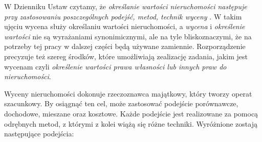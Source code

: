 \documentclass[a4paper,12pt,twoside,openany]{report}
\begin{document}
W Dzienniku Ustaw czytamy, że \textit{określanie wartości nieruchomości następuje przy zastosowaniu poszczególnych podejść, metod, technik wyceny} \cite{OPRM}. W takim ujęciu wycena służy określaniu wartości nieruchomości, a \textit{wycena} i \textit{określenie wartości} nie są wyrażaniami synonimicznymi, ale na tyle bliskoznaczymi, że na potrzeby tej pracy w dalszej części będą używane zamiennie.
Rozporządzenie precyzuje też szereg środków, które umożliwiają zealizację zadania, jakim jest wycenam czyli \textit {określenie wartości prawa własności lub innych praw do nieruchomości}.

Wyceny nieruchomości dokonuje rzeczoznawca majątkowy, który tworzy  operat szacunkowy. By osiągnąć ten cel, może zastosować podejście porównawcze, dochodowe, mieszane oraz kosztowe. Każde podejście jest realizowane za pomocą odrębnych metod, z którymi z kolei wiążą się różne techniki.
Wyróżnione zostają następujące podejścia:
\end{document}

